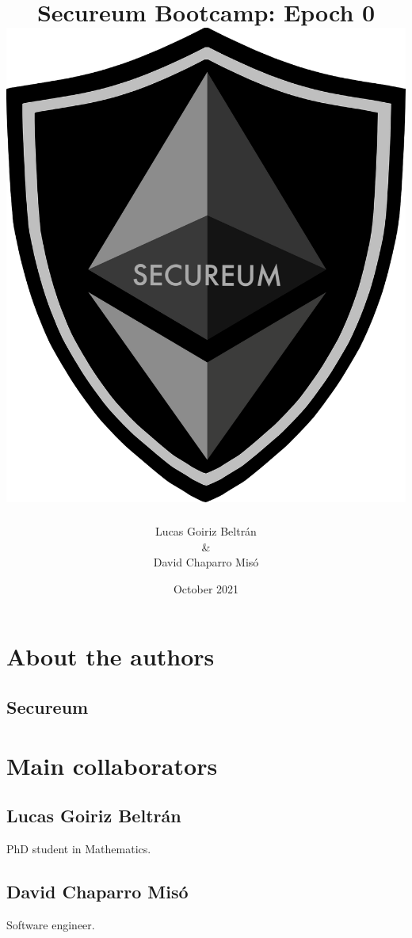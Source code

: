 \documentclass[oneside]{book}
\title{
\textbf{\Huge Secureum Bootcamp: Epoch 0}\\
\vspace{1cm}
\includegraphics[scale=0.25]{dependencies/Img/secureum_logo}
}
\author{Lucas Goiriz Beltr\'an\\\&\\David Chaparro Mis\'o}
\date{October 2021}
\renewcommand{\thepage}{}
\begin{document}
\maketitle

\chapter*{About the authors}

\section*{Secureum}

\chapter*{Main collaborators}

\section*{Lucas Goiriz Beltrán}

PhD student in Mathematics.

\section*{David Chaparro Misó}

Software engineer.

\tableofcontents

\pagebreak

\setcounter{page}{1}
\renewcommand{\thepage}{\arabic{page}}













\end{document}
